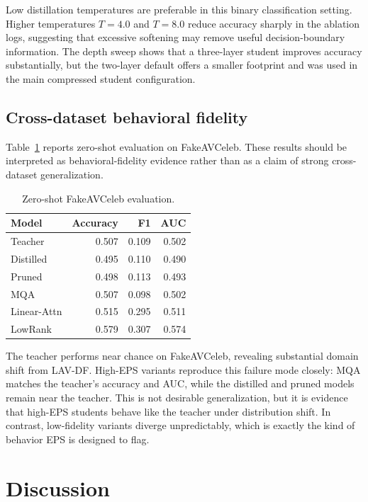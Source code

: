 \documentclass[pdflatex,sn-basic,Numbered]{sn-jnl}
\begin{document}
Low distillation temperatures are preferable in this binary classification setting. Higher temperatures $T=4.0$ and $T=8.0$ reduce accuracy sharply in the ablation logs, suggesting that excessive softening may remove useful decision-boundary information. The depth sweep shows that a three-layer student improves accuracy substantially, but the two-layer default offers a smaller footprint and was used in the main compressed student configuration.

\subsection{Cross-dataset behavioral fidelity}\label{subsec:cross-dataset}

Table~\ref{tab:cross-dataset} reports zero-shot evaluation on FakeAVCeleb. These results should be interpreted as behavioral-fidelity evidence rather than as a claim of strong cross-dataset generalization.

\begin{table}[t]
\caption{Zero-shot FakeAVCeleb evaluation.}\label{tab:cross-dataset}
\centering
\begin{tabular}{lrrr}
\toprule
Model & Accuracy & F1 & AUC \\
\midrule
Teacher & 0.507 & 0.109 & 0.502 \\
Distilled & 0.495 & 0.110 & 0.490 \\
Pruned & 0.498 & 0.113 & 0.493 \\
MQA & 0.507 & 0.098 & 0.502 \\
Linear-Attn & 0.515 & 0.295 & 0.511 \\
LowRank & 0.579 & 0.307 & 0.574 \\
\bottomrule
\end{tabular}
\end{table}

The teacher performs near chance on FakeAVCeleb, revealing substantial domain shift from LAV-DF. High-EPS variants reproduce this failure mode closely: MQA matches the teacher's accuracy and AUC, while the distilled and pruned models remain near the teacher. This is not desirable generalization, but it is evidence that high-EPS students behave like the teacher under distribution shift. In contrast, low-fidelity variants diverge unpredictably, which is exactly the kind of behavior EPS is designed to flag.

\section{Discussion}\label{sec:discussion}
\end{document}
